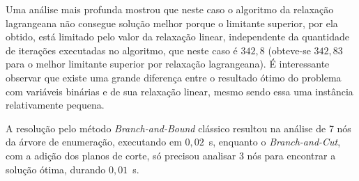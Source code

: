 \documentclass{article}
\begin{document}
    Uma análise mais profunda mostrou que neste caso o algoritmo da relaxação lagrangeana não consegue solução melhor porque o limitante superior, por ela obtido, está limitado pelo valor da relaxação linear, independente da quantidade de iterações executadas no algoritmo, que neste caso é $ 342{,}8 $ (obteve-se $ 342{,}83 $ para o melhor limitante superior por relaxação lagrangeana). É interessante observar que existe uma grande diferença entre o resultado ótimo do problema com variáveis binárias e de sua relaxação linear, mesmo sendo essa uma instância relativamente pequena. 
    
    
    A resolução pelo método \emph{Branch-and-Bound} clássico resultou na análise de 7 nós da árvore de enumeração, executando em $0{,}02$~s, enquanto o \emph{Branch-and-Cut}, com a adição dos planos de corte, só precisou analisar 3 nós para encontrar a solução ótima, durando $0{,}01$~s. 
    
\end{document}
